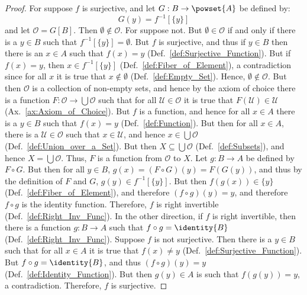        \begin{proof}
            For suppose $f$ is surjective, and let
            $G:B\rightarrow\powset{A}$ be defined by:
            \begin{equation}
                G(y)=f^{\minus{1}}[\{y\}]
            \end{equation}
            and let $\mathcal{O}=G[B]$. Then $\emptyset\notin\mathcal{O}$. For
            suppose not. But $\emptyset\in\mathcal{O}$ if and only if there is a
            $y\in{B}$ such that $f^{\minus{1}}[\{y\}]=\emptyset$. But $f$ is
            surjective, and thus if $y\in{B}$ then there is an $x\in{A}$ such
            that $f(x)=y$ (Def.~\ref{def:Surjective_Function}). But if $f(x)=y$,
            then $x\in{f}^{\minus{1}}[\{y\}]$ (Def.~\ref{def:Fiber_of_Element}),
            a contradiction since for all $x$ it is true that $x\notin\emptyset$
            (Def.~\ref{def:Empty_Set}). Hence, $\emptyset\notin\mathcal{O}$.
            But then $\mathcal{O}$ is a collection of non-empty sets, and hence
            by the axiom of choice there is a function
            $F:\mathcal{O}\rightarrow\bigcup\mathcal{O}$ such that for all
            $\mathcal{U}\in\mathcal{O}$ it is true that
            $F(\mathcal{U})\in\mathcal{U}$ (Ax.~\ref{ax:Axiom_of_Choice}). But
            $f$ is a function, and hence for all $x\in{A}$ there is a $y\in{B}$
            such that $f(x)=y$ (Def.~\ref{def:Function}). But then for all
            $x\in{A}$, there is a $\mathcal{U}\in\mathcal{O}$ such that
            $x\in\mathcal{U}$, and hence $x\in\bigcup\mathcal{O}$
            (Def.~\ref{def:Union_over_a_Set}). But then
            $X\subseteq\bigcup\mathcal{O}$ (Def.~\ref{def:Subsets}), and hence
            $X=\bigcup\mathcal{O}$. Thus, $F$ is a function from $\mathcal{O}$
            to $X$. Let $g:B\rightarrow{A}$ be defined by $F\circ{G}$. But then
            for all $y\in{B}$, $g(x)=(F\circ{G})(y)=F(G(y))$, and thus by the
            definition of $F$ and $G$, $g(y)\in{f}^{\minus{1}}[\{y\}]$. But then
            $f(g(x))\in\{y\}$ (Def.~\ref{def:Fiber_of_Element}), and therefore
            $(f\circ{g})(y)=y$, and therefore $f\circ{g}$ is the identity
            function. Therefore, $f$ is right invertible
            (Def.~\ref{def:Right_Inv_Func}). In the other direction, if $f$ is
            right invertible, then there is a function $g:B\rightarrow{A}$ such
            that $f\circ{g}=\identity{B}$ (Def.~\ref{def:Right_Inv_Func}).
            Suppose $f$ is not surjective. Then there is a $y\in{B}$ such that
            for all $x\in{A}$ it is true that $f(x)\ne{y}$
            (Def.~\ref{def:Surjective_Function}). But $f\circ{g}=\identity{B}$,
            and thus $(f\circ{g})(y)=y$ (Def.~\ref{def:Identity_Function}). But
            then $g(y)\in{A}$ is such that $f(g(y))=y$, a contradiction.
            Therefore, $f$ is surjective.
        \end{proof}
